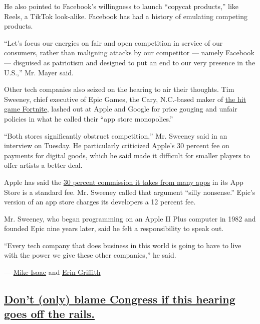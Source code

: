 He also pointed to Facebook's willingness to launch ``copycat
products,'' like Reels, a TikTok look-alike. Facebook has had a history
of emulating competing products.

``Let's focus our energies on fair and open competition in service of
our consumers, rather than maligning attacks by our competitor ---
namely Facebook --- disguised as patriotism and designed to put an end
to our very presence in the U.S.,'' Mr. Mayer said.

Other tech companies also seized on the hearing to air their thoughts.
Tim Sweeney, chief executive of Epic Games, the Cary, N.C.-based maker
of
\href{https://www.nytimes3xbfgragh.onion/2018/07/25/arts/what-is-fortnite-battle-royale-nyt.html}{the
hit game Fortnite}, lashed out at Apple and Google for price gouging and
unfair policies in what he called their ``app store monopolies.''

``Both stores significantly obstruct competition,'' Mr. Sweeney said in
an interview on Tuesday. He particularly criticized Apple's 30 percent
fee on payments for digital goods, which he said made it difficult for
smaller players to offer artists a better deal.

Apple has said the
\href{https://www.nytimes3xbfgragh.onion/2020/07/28/technology/apple-app-store-airbnb-classpass.html}{30
percent commission it takes from many apps} in its App Store is a
standard fee. Mr. Sweeney called that argument ``silly nonsense.''
Epic's version of an app store charges its developers a 12 percent fee.

Mr. Sweeney, who began programming on an Apple II Plus computer in 1982
and founded Epic nine years later, said he felt a responsibility to
speak out.

``Every tech company that does business in this world is going to have
to live with the power we give these other companies,'' he said.

--- \href{https://www.nytimes3xbfgragh.onion/by/mike-isaac}{Mike Isaac}
and \href{https://www.nytimes3xbfgragh.onion/by/erin-griffith}{Erin
Griffith}

\hypertarget{dont-only-blame-congress-if-this-hearing-goes-off-the-rails}{%
\subsection{\texorpdfstring{\protect\hyperlink{dont-only-blame-congress-if-this-hearing-goes-off-the-rails}{Don't
(only) blame Congress if this hearing goes off the
rails.}}{Don't (only) blame Congress if this hearing goes off the rails.}}\label{dont-only-blame-congress-if-this-hearing-goes-off-the-rails}}

